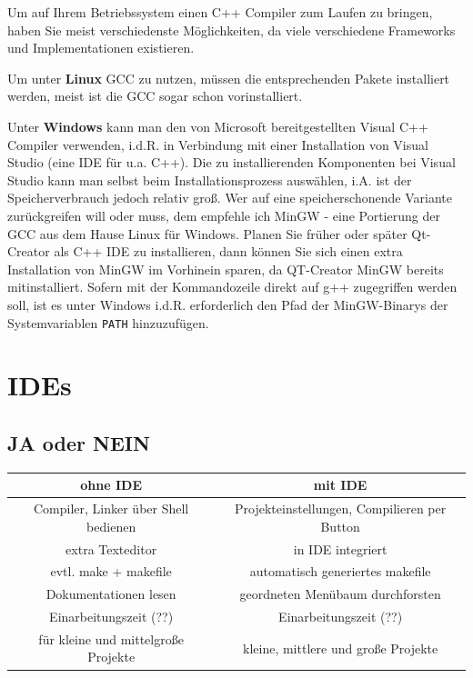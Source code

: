 \documentclass[a4paper]{report}
\begin{document}
Um auf Ihrem Betriebssystem einen C++ Compiler zum Laufen zu bringen, haben Sie meist verschiedenste Möglichkeiten, da viele verschiedene Frameworks und Implementationen existieren.
\medskip

Um unter \textbf{Linux} GCC zu nutzen, müssen die entsprechenden Pakete installiert werden, meist ist die GCC sogar schon vorinstalliert.
\medskip

Unter \textbf{Windows} kann man den von Microsoft bereitgestellten Visual C++ Compiler verwenden, i.d.R. in Verbindung mit einer Installation von Visual Studio (eine IDE für u.a. C++). Die zu installierenden Komponenten bei Visual Studio kann man selbst beim Installationsprozess auswählen, i.A. ist der Speicherverbrauch jedoch relativ groß. Wer auf eine speicherschonende Variante zurückgreifen will oder muss, dem empfehle ich MinGW - eine Portierung der GCC aus dem Hause Linux für Windows. Planen Sie früher oder später Qt-Creator als C++ IDE zu installieren, dann können Sie sich einen extra Installation von MinGW im Vorhinein sparen, da QT-Creator MinGW bereits mitinstalliert. Sofern mit der Kommandozeile direkt auf g++ zugegriffen werden soll, ist es unter Windows i.d.R. erforderlich den Pfad der MinGW-Binarys der Systemvariablen \texttt{PATH} hinzuzufügen.


\section{IDEs}
\subsection{JA oder NEIN}
\begin{center}
\begin{tabular}{|c||c|}
	\hline
	\textbf{ohne IDE} & \textbf{mit IDE} \\
	\hline \hline
	Compiler, Linker über Shell bedienen	&	Projekteinstellungen, Compilieren per Button \\
	extra Texteditor				&		in IDE integriert\\
	evtl. make + makefile	&	automatisch generiertes makefile \\
	Dokumentationen lesen & geordneten Menübaum durchforsten\\
	\hline \hline
	Einarbeitungszeit (??) & Einarbeitungszeit (??) \\
	für kleine und mittelgroße Projekte & kleine, mittlere und große Projekte \\
	\hline
\end{tabular}
\end{center}
\end{document}
